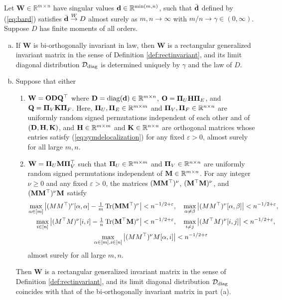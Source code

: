 \documentclass[10pt,reqno]{amsart}
\def\W{\mathbf{W}}
\def\R{\mathbb{R}}
\def\diag{\operatorname{diag}}
\def\toW{\overset{W}{\to}}
\def\bW{{\mathbf{W}}}
\def\eps{\varepsilon}
\def\Tr{\operatorname{Tr}}
\newcommand{\tdiag}{\mathrm{diag}}
\begin{document}
\begin{proposition}\label{prop:rectinvariant}
Let $\bW \in \R^{m \times n}$ have singular values $\bd \in \R^{\min(m,n)}$,
such that $\bar{\mathbf{d}}$ defined by (\ref{eq:bard}) satisfies
$\bar\bd \toW D$ almost surely as $m,n \to \infty$ with $m/n \to \gamma \in
(0,\infty)$. Suppose $D$ has finite moments of all orders.
\begin{enumerate}[(a)]
\item If $\bW$ is bi-orthogonally invariant in law, then $\bW$ is a
rectangular generalized invariant matrix in the sense of Definition
\ref{def:rectinvariant}, and its limit diagonal distribution $\cD_\tdiag$ is
determined uniquely by $\gamma$ and the law of $D$.
\item Suppose that either
\begin{enumerate}[1.]
\item $\W=\bO\bD\bQ^\top$ where $\bD=\diag(\bd) \in \R^{m \times n}$,
$\mathbf{O}=\bm{\Pi}_U\mathbf{H}\bm{\Pi}_E$, and $\mathbf{Q}=\bm{\Pi}_V\mathbf{K}\bm{\Pi}_F$. Here, $\bPi_U,\bPi_E \in
\R^{m \times m}$ and $\bPi_V,\bPi_F \in \R^{n \times n}$ are uniformly random
signed permutations independent of each other and of $(\mathbf{D},\mathbf{H},\mathbf{K})$, and
$\bH \in \R^{m \times m}$ and $\bK \in \R^{n \times n}$ are orthogonal matrices
whose entries satisfy (\ref{eq:symdelocalization})
for any fixed $\eps>0$, almost surely for all large $m,n$.
\item $\bW=\bPi_U\bM\bPi_V^\top$ such that $\bPi_U \in \R^{m \times m}$ and $\bPi_V
\in \R^{n \times n}$ are uniformly random signed permutations independent of
$\bM \in \R^{m \times n}$. For any integer $\nu \geq 0$ and any fixed $\eps>0$,
the matrices $(\mathbf{M}\mathbf{M}^\top)^\nu$, $(\mathbf{M}^\top\mathbf{M})^\nu$,
and $(\mathbf{M}\mathbf{M}^\top)^\nu\mathbf{M}$ satisfy
\begin{equation}\label{eq:Mcondition_rec}
\begin{aligned}
\max_{\alpha \in [m]} \big|(MM^\top)^\nu[\alpha,\alpha]-\tfrac{1}{m}\Tr
(\bM\bM^\top)^\nu\big|<n^{-1/2+\eps},&
\quad \max_{\alpha \neq \beta} \big|(MM^\top)^\nu[\alpha,\beta]\big|<n^{-1/2+\eps},\\
\max_{i \in [n]} \big|(M^\top M)^\nu[i,i]-\tfrac{1}{n}\Tr (\bM^\top\bM)^\nu\big|
<n^{-1/2+\eps},&
\quad \max_{i \neq j} \big|(M^\top M)^\nu[i,j]\big|<n^{-1/2+\eps},\\
\max_{\alpha \in [m],i \in [n]} \big|(MM^\top)^\nu
M[\alpha,i]\big|&<n^{-1/2+\eps}
\end{aligned}
\end{equation}
almost surely for all large $m,n$.
\end{enumerate}
Then $\bW$ is a rectangular generalized invariant matrix in the sense of
Definition \ref{def:rectinvariant}, and its limit diagonal distribution
$\cD_\tdiag$ coincides with that of the bi-orthogonally invariant matrix in part
(a).
\end{enumerate}
\end{proposition}
\end{document}
